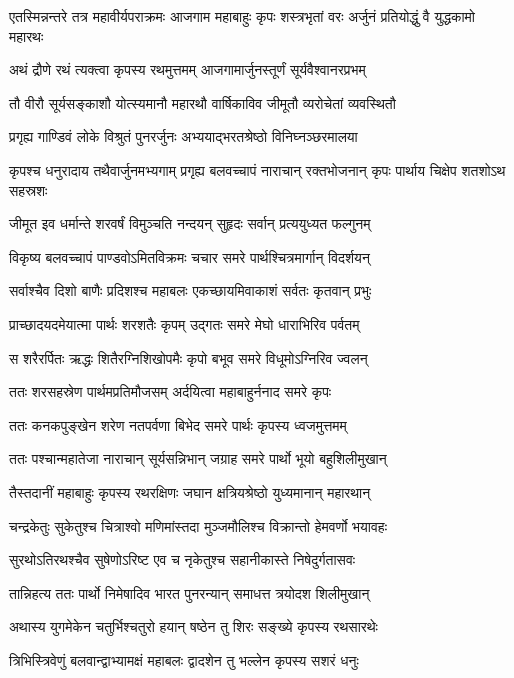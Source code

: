 \threelineshloka
{एतस्मिन्नन्तरे तत्र महावीर्यपराक्रमः}
{आजगाम महाबाहुः कृपः शस्त्रभृतां वरः}
{अर्जुनं प्रतियोद्धुं वै युद्धकामो महारथः}


\twolineshloka
{अथं द्रौणे रथं त्यक्त्वा कृपस्य रथमुत्तमम्}
{आजगामार्जुनस्तूर्णं सूर्यवैश्वानरप्रभम्}


\twolineshloka
{तौ वीरौ सूर्यसङ्काशौ योत्स्यमानौ महारथौ}
{वार्षिकाविव जीमूतौ व्यरोचेतां व्यवस्थितौ}


\twolineshloka
{प्रगृह्य गाण्डिवं लोके विश्रुतं पुनरर्जुनः}
{अभ्ययाद्भरतश्रेष्ठो विनिघ्नञ्छरमालया}


\onelineshloka
{कृपश्च धनुरादाय तथैवार्जुनमभ्यगाम्}
\twolineshloka
{प्रगृह्य बलवच्चापं नाराचान् रक्तभोजनान्}
{कृपः पार्थाय चिक्षेप शतशोऽथ सहस्रशः}


\twolineshloka
{जीमूत इव धर्मान्ते शरवर्षं विमुञ्चति}
{नन्दयन् सुहृदः सर्वान् प्रत्ययुध्यत फल्गुनम्}


\twolineshloka
{विकृष्य बलवच्चापं पाण्डवोऽमितविक्रमः}
{चचार समरे पार्थश्चित्रमार्गान् विदर्शयन्}


\twolineshloka
{सर्वाश्चैव दिशो बाणैः प्रदिशश्च महाबलः}
{एकच्छायमिवाकाशं सर्वतः कृतवान् प्रभुः}


\twolineshloka
{प्राच्छादयदमेयात्मा पार्थः शरशतैः कृपम्}
{उद्गतः समरे मेघो धाराभिरिव पर्वतम्}


\twolineshloka
{स शरैरर्पितः ऋद्धः शितैरग्निशिखोपमैः}
{कृपो बभूव समरे विधूमोऽग्निरिव ज्वलन्}


\twolineshloka
{ततः शरसहस्रेण पार्थमप्रतिमौजसम्}
{अर्दयित्वा महाबाहुर्ननाद समरे कृपः}


\twolineshloka
{ततः कनकपुङ्खेन शरेण नतपर्वणा}
{बिभेद समरे पार्थः कृपस्य ध्वजमुत्तमम्}


\twolineshloka
{ततः पश्चान्महातेजा नाराचान् सूर्यसन्निभान्}
{जग्राह समरे पार्थो भूयो बहुशिलीमुखान्}


\twolineshloka
{तैस्तदानीं महाबाहुः कृपस्य रथरक्षिणः}
{जघान क्षत्रियश्रेष्ठो युध्यमानान् महारथान्}


\twolineshloka
{चन्द्रकेतुः सुकेतुश्च चित्राश्वो मणिमांस्तदा}
{मुञ्जमौलिश्च विक्रान्तो हेमवर्णो भयावहः}


\twolineshloka
{सुरथोऽतिरथश्चैव सुषेणोऽरिष्ट एव च}
{नृकेतुश्च सहानीकास्ते निषेदुर्गतासवः}


\twolineshloka
{तान्निहत्य ततः पार्थो निमेषादिव भारत}
{पुनरन्यान् समाधत्त त्रयोदश शिलीमुखान्}


\twolineshloka
{अथास्य युगमेकेन चतुर्भिश्चतुरो हयान्}
{षष्ठेन तु शिरः सङ्ख्ये कृपस्य रथसारथेः}


\twolineshloka
{त्रिभिस्त्रिवेणुं बलवान्द्वाभ्यामक्षं महाबलः}
{द्वादशेन तु भल्लेन कृपस्य सशरं धनुः}


